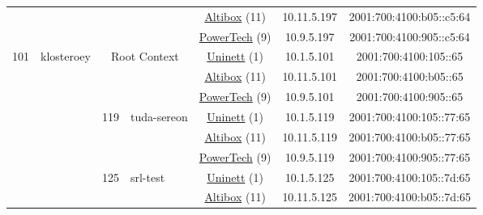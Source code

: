 \begin{small}
\begin{center}
\begin{longtable}{|c|c|c|c|c|c|c|c|}
  &  &  &  & \multicolumn{2}{|c|}{\tiny{\href{https://www.altibox.no}{Altibox} (11)}} & \tiny{10.11.5.197} & \tiny{2001:700:4100:b05::c5:64} \\* \cline{5-5}\cline{6-6}\cline{7-7}\cline{8-8}
  &  &  &  & \multicolumn{2}{|c|}{\tiny{\href{http://www.powertech.no}{PowerTech} (9)}} & \tiny{10.9.5.197} & \tiny{2001:700:4100:905::c5:64} \\ \hline
 \multirow{39}{*}{\tiny{101}} & \multicolumn{1}{|l|}{\multirow{39}{*}{\tiny{klosteroey}}} & \multicolumn{2}{|c|}{\multirow{3}{*}{\tiny{Root Context}}} & \multicolumn{2}{|c|}{\tiny{\href{https://www.uninett.no}{Uninett} (1)}} & \tiny{10.1.5.101} & \tiny{2001:700:4100:105::65} \\* \cline{5-5}\cline{6-6}\cline{7-7}\cline{8-8}
  &  & \multicolumn{2}{|c|}{} & \multicolumn{2}{|c|}{\tiny{\href{https://www.altibox.no}{Altibox} (11)}} & \tiny{10.11.5.101} & \tiny{2001:700:4100:b05::65} \\* \cline{5-5}\cline{6-6}\cline{7-7}\cline{8-8}
  &  & \multicolumn{2}{|c|}{} & \multicolumn{2}{|c|}{\tiny{\href{http://www.powertech.no}{PowerTech} (9)}} & \tiny{10.9.5.101} & \tiny{2001:700:4100:905::65} \\* \cline{3-3}\cline{4-4}\cline{5-5}\cline{6-6}\cline{7-7}\cline{8-8}
  &  & \multirow{3}{*}{\tiny{119}} & \multicolumn{1}{|l|}{\multirow{3}{*}{\tiny{tuda-sereon}}} & \multicolumn{2}{|c|}{\tiny{\href{https://www.uninett.no}{Uninett} (1)}} & \tiny{10.1.5.119} & \tiny{2001:700:4100:105::77:65} \\* \cline{5-5}\cline{6-6}\cline{7-7}\cline{8-8}
  &  &  &  & \multicolumn{2}{|c|}{\tiny{\href{https://www.altibox.no}{Altibox} (11)}} & \tiny{10.11.5.119} & \tiny{2001:700:4100:b05::77:65} \\* \cline{5-5}\cline{6-6}\cline{7-7}\cline{8-8}
  &  &  &  & \multicolumn{2}{|c|}{\tiny{\href{http://www.powertech.no}{PowerTech} (9)}} & \tiny{10.9.5.119} & \tiny{2001:700:4100:905::77:65} \\* \cline{3-3}\cline{4-4}\cline{5-5}\cline{6-6}\cline{7-7}\cline{8-8}
  &  & \multirow{3}{*}{\tiny{125}} & \multicolumn{1}{|l|}{\multirow{3}{*}{\tiny{srl-test}}} & \multicolumn{2}{|c|}{\tiny{\href{https://www.uninett.no}{Uninett} (1)}} & \tiny{10.1.5.125} & \tiny{2001:700:4100:105::7d:65} \\* \cline{5-5}\cline{6-6}\cline{7-7}\cline{8-8}
  &  &  &  & \multicolumn{2}{|c|}{\tiny{\href{https://www.altibox.no}{Altibox} (11)}} & \tiny{10.11.5.125} & \tiny{2001:700:4100:b05::7d:65} \\* \cline{5-5}\cline{6-6}\cline{7-7}\cline{8-8}

\end{longtable}
\end{center}
\end{small}
